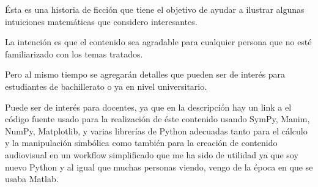 \documentclass[preview]{standalone}
\begin{document}
\begin{center}
Ésta es una historia de ficción que tiene el objetivo de ayudar a ilustrar algunas intuiciones matemáticas que considero interesantes. 

$$ $$
La intención es que el contenido sea agradable para cualquier persona que no esté familiarizado con los temas tratados.  

$$ $$
Pero al mismo tiempo se agregarán detalles que pueden ser de interés para estudiantes de bachillerato o ya en nivel universitario. 

$$ $$
Puede ser de interés para docentes, ya que en la descripción hay un link a el código fuente usado para la realización de éste contenido usando SymPy, Manim, NumPy, Matplotlib, y varias librerías de Python adecuadas tanto para el cálculo y la manipulación simbólica como también para la creación de contenido audiovisual en un workflow simplificado que me ha sido de utilidad ya que  soy nuevo Python y al igual que muchas personas viendo, vengo de la época en que se usaba Matlab.
\end{center}
\end{document}
